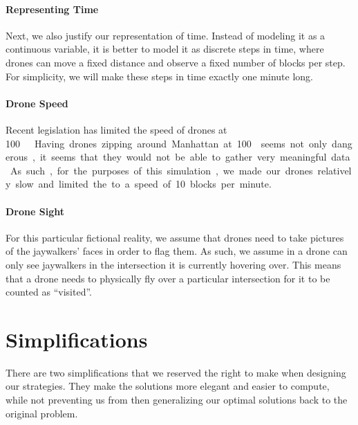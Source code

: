 \documentclass{article}
\begin{document}
\paragraph{Representing Time}
\label{par:representing_time}
Next, we also justify our representation of time. Instead of modeling it as a continuous variable, it is better to model it as discrete steps in time, where drones can move a fixed distance and observe a fixed number of blocks per step. For simplicity, we will make these steps in time exactly one minute long.

\paragraph{Drone Speed}
\label{par:drone_speed}
Recent legislation has limited the speed of drones at \SI{100}\mph \cite{dronespeed}. Having drones zipping around Manhattan at \SI{100}\mph seems not only dangerous, it seems that they would not be able to gather very meaningful data. As such, for the purposes of this simulation, we made our drones relatively slow and limited the to a speed of 10 blocks per minute.

\paragraph{Drone Sight}
\label{par:drone_sight}
For this particular fictional reality, we assume that drones need to take pictures of the jaywalkers' faces in order to flag them. As such, we assume in a drone can only see jaywalkers in the intersection it is currently hovering over. This means that a drone needs to physically fly over a particular intersection for it to be counted as ``visited''.

\section{Simplifications}
There are two simplifications that we reserved the right to make when designing our strategies. They make the solutions more elegant and easier to compute, while not preventing us from then generalizing our optimal solutions back to the original problem.
\end{document}
